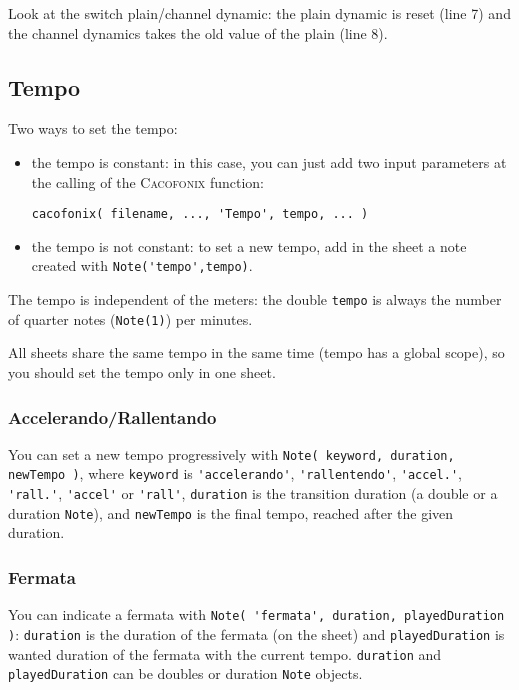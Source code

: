\documentclass{article}
\newcommand{\cacofonix}{\textsc{Cacofonix}\xspace}
\newcommand{\note}{\lstinline!Note!\xspace}
\begin{document}
Look at the switch plain/channel dynamic: the plain dynamic is reset (line 7) and the channel dynamics takes the old value of the plain (line 8).

\subsection{Tempo}
\label{sec:Tempo}

Two ways to set the tempo:
\begin{itemize}
	\item the tempo is constant: in this case, you can just add two input parameters at the calling of the \cacofonix function:
\begin{lstlisting}
cacofonix( filename, ..., 'Tempo', tempo, ... )
\end{lstlisting}
	\item the tempo is not constant: to set a new tempo, add in the sheet a note created with \lstinline!Note('tempo',tempo)!.
\end{itemize}

The tempo is independent of the meters: the double \lstinline!tempo! is always the number of quarter notes (\lstinline!Note(1)!) per minutes.

All sheets share the same tempo in the same time (tempo has a global scope), so you should set the tempo only in one sheet.

\subsubsection{Accelerando/Rallentando}
\label{sec:AccelerandoRallentando}

You can set a new tempo progressively with \lstinline!Note( keyword, duration, newTempo )!, where \lstinline!keyword! is \lstinline!'accelerando'!, \lstinline!'rallentendo'!, \lstinline!'accel.'!, \lstinline!'rall.'!, \lstinline!'accel'! or \lstinline!'rall'!, \lstinline!duration! is the transition duration (a double or a duration \note), and \lstinline!newTempo! is the final tempo, reached after the given duration.

\subsubsection{Fermata}
\label{sec:Fermata}

You can indicate a fermata with \lstinline!Note( 'fermata', duration, playedDuration )!: \lstinline!duration! is the duration of the fermata (on the sheet) and \lstinline!playedDuration! is wanted duration of the fermata with the current tempo. \lstinline!duration! and \lstinline!playedDuration! can be doubles or duration \note objects.
\end{document}
